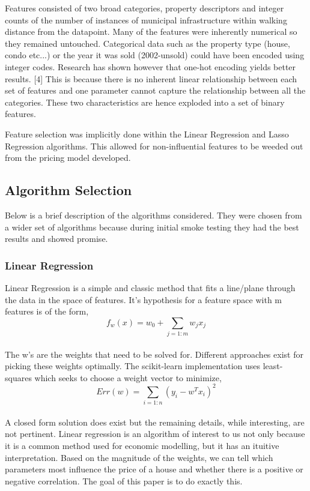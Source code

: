 \documentclass{acm_proc_article-sp}
\begin{document}
	Features consisted of two broad categories, property descriptors and integer counts of the number of instances of municipal infrastructure within walking distance from the datapoint. Many of the features were inherently numerical so they remained untouched. Categorical data such as the property type (house, condo etc...) or the year it was sold (2002-unsold) could have been encoded using integer codes. Research has shown however that one-hot encoding yields better results. [4] This is because there is no inherent linear relationship between each set of features and one parameter cannot capture the relationship between all the categories. These two characteristics are hence exploded into a set of binary features.
	
	Feature selection was implicitly done within the Linear Regression and Lasso Regression algorithms. This allowed for non-influential features to be weeded out from the pricing model developed.
	
\subsection{Algorithm Selection}
	Below is a brief description of the algorithms considered. They were chosen from a wider set of algorithms because during initial smoke testing they had the best results and showed promise. 
	
\subsubsection{Linear Regression}
	Linear Regression is a simple and classic method that fits a line/plane through the data in the space of features. It's hypothesis for a feature space with m features is of the form, \\
	\[  f_{w}(x) = w_{0}  + \sum_{j=1:m}w_{j}x_{j} \] \\

	The w's are the weights that need to be solved for. Different approaches exist for picking these weights optimally. The scikit-learn implementation uses least-squares which seeks to choose a weight vector to minimize,
	\[ Err(w)  = \sum_{i=1:n}(y_{i} - w^{T}x_{i})^{2}\] \\
	
	A closed form solution does exist but the remaining details, while interesting, are not pertinent. Linear regression is an algorithm of interest to us not only because it is a common method used for economic modelling, but it has an ituitive interpretation. Based on the magnitude of the weights, we can tell which parameters most influence the price of a house and whether there is a positive or negative correlation. The goal of this paper is to do exactly this.
	
\end{document}
